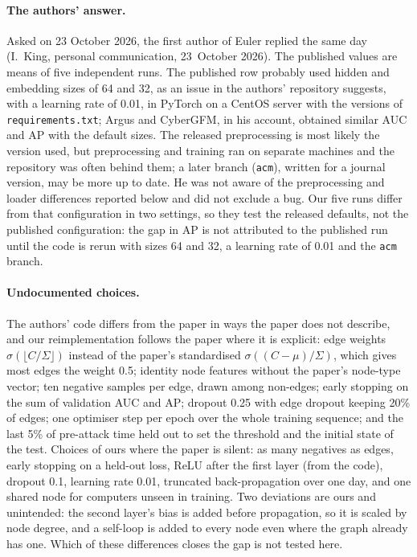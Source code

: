 \documentclass[11pt,a4paper]{article}
\begin{document}
\paragraph{The authors' answer.} Asked on 23 October 2026, the first author of Euler replied the same day (I.~King, personal communication, 23~October 2026). The published values are means of five independent runs. The published row probably used hidden and embedding sizes of 64 and 32, as an issue in the authors' repository suggests, with a learning rate of 0.01, in PyTorch on a CentOS server with the versions of \texttt{requirements.txt}; Argus and CyberGFM, in his account, obtained similar AUC and AP with the default sizes. The released preprocessing is most likely the version used, but preprocessing and training ran on separate machines and the repository was often behind them; a later branch (\texttt{acm}), written for a journal version, may be more up to date. He was not aware of the preprocessing and loader differences reported below and did not exclude a bug. Our five runs differ from that configuration in two settings, so they test the released defaults, not the published configuration: the gap in AP is not attributed to the published run until the code is rerun with sizes 64 and 32, a learning rate of 0.01 and the \texttt{acm} branch.

\paragraph{Undocumented choices.} The authors' code differs from the paper in ways the paper does not describe, and our reimplementation follows the paper where it is explicit: edge weights $\sigma(\lfloor C/\Sigma \rfloor)$ instead of the paper's standardised $\sigma((C - \mu)/\Sigma)$, which gives most edges the weight 0.5; identity node features without the paper's node-type vector; ten negative samples per edge, drawn among non-edges; early stopping on the sum of validation AUC and AP; dropout 0.25 with edge dropout keeping 20\% of edges; one optimiser step per epoch over the whole training sequence; and the last 5\% of pre-attack time held out to set the threshold and the initial state of the test. Choices of ours where the paper is silent: as many negatives as edges, early stopping on a held-out loss, ReLU after the first layer (from the code), dropout 0.1, learning rate 0.01, truncated back-propagation over one day, and one shared node for computers unseen in training. Two deviations are ours and unintended: the second layer's bias is added before propagation, so it is scaled by node degree, and a self-loop is added to every node even where the graph already has one. Which of these differences closes the gap is not tested here.
\end{document}
